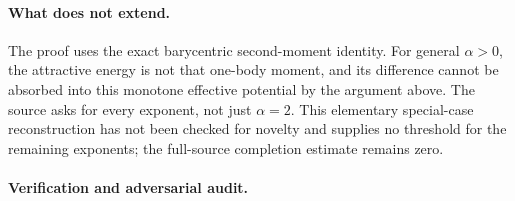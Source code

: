 \documentclass[11pt]{article}
\begin{document}
\paragraph{What does not extend.}
The proof uses the exact barycentric second-moment identity. For general $\alpha>0$, the attractive energy is not that one-body moment, and its difference cannot be absorbed into this monotone effective potential by the argument above. The source asks for every exponent, not just $\alpha=2$. This elementary special-case reconstruction has not been checked for novelty and supplies no threshold for the remaining exponents; the full-source completion estimate remains zero.

\paragraph{Verification and adversarial audit.}
\end{document}
